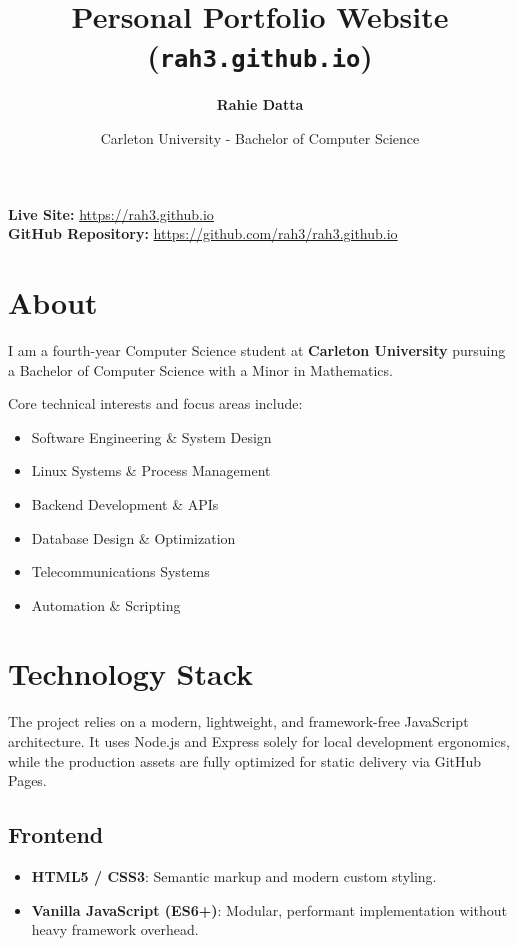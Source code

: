 \documentclass{article}
\title{\textbf{Personal Portfolio Website (\texttt{rah3.github.io})}}
\author{\textbf{Rahie Datta}}
\date{Carleton University - Bachelor of Computer Science}
\begin{document}
\maketitle

\noindent\textbf{Live Site:} \url{https://rah3.github.io} \\
\textbf{GitHub Repository:} \url{https://github.com/rah3/rah3.github.io}

\vspace{0.5cm}

\section{About}

I am a fourth-year Computer Science student at \textbf{Carleton University} pursuing a Bachelor of Computer Science with a Minor in Mathematics. 

Core technical interests and focus areas include:
\begin{itemize}
    \item Software Engineering \& System Design
    \item Linux Systems \& Process Management
    \item Backend Development \& APIs
    \item Database Design \& Optimization
    \item Telecommunications Systems
    \item Automation \& Scripting
\end{itemize}

\section{Technology Stack}

The project relies on a modern, lightweight, and framework-free JavaScript architecture. It uses Node.js and Express solely for local development ergonomics, while the production assets are fully optimized for static delivery via GitHub Pages.

\subsection{Frontend}
\begin{itemize}
    \item \textbf{HTML5 / CSS3}: Semantic markup and modern custom styling.
    \item \textbf{Vanilla JavaScript (ES6+)}: Modular, performant implementation without heavy framework overhead.
\end{itemize}
\end{document}
